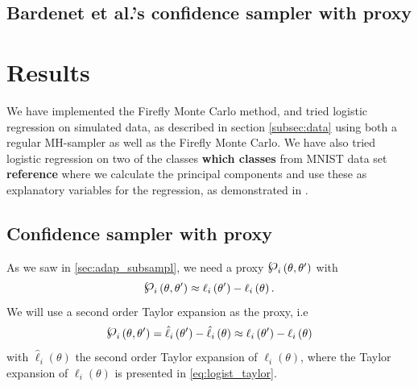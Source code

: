 \subsection{Bardenet et al.'s confidence sampler with proxy}






\section*{Results}
We have implemented the Firefly Monte Carlo method, and tried logistic regression on simulated data, as described in section \ref{subsec:data} using both a regular MH-sampler as well as the Firefly Monte Carlo. 
We have also tried logistic regression on two of the classes \textbf{which classes} from MNIST data set \textbf{reference} where we calculate the principal components and use these as explanatory variables for the regression, as demonstrated in \cite{Maclaurin:1}. 

\subsection{Confidence sampler with proxy}
As we saw in \ref{sec:adap_subsampl}, we need a proxy $\powerset_i\left(\theta, \theta'\right)$ with $$\powerset_i\left(\theta, \theta'\right) \approx \ell_i\left(\theta'\right) - \ell_i\left(\theta\right). $$   
We will use a second order Taylor expansion as the proxy, i.e 
\begin{equation}
    \powerset_i\left(\theta, \theta'\right) = \hat{\ell}_i\left(\theta'\right) - \hat{\ell}_i\left(\theta\right) \approx \ell_i\left(\theta'\right) - \ell_i\left(\theta\right)
\end{equation}
with $\hat{\ell}_i\left(\theta\right)$ the second order Taylor expansion of $\ell_i\left(\theta\right)$, where the Taylor expansion of $\ell_i\left(\theta\right)$ is presented in \eqref{eq:logist_taylor}. 
